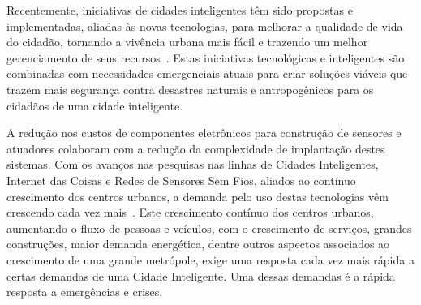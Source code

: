 \begin{refsection}
Recentemente, iniciativas de cidades inteligentes têm sido propostas e implementadas, aliadas às novas tecnologias, para melhorar a qualidade de vida do cidadão, tornando a vivência urbana mais fácil e trazendo um melhor gerenciamento de seus recursos~\cite{Alkhatib2019771}. Estas iniciativas tecnológicas e inteligentes são combinadas com necessidades emergenciais atuais para criar soluções viáveis que trazem mais segurança contra desastres naturais e antropogênicos para os cidadãos de uma cidade inteligente.


A redução nos custos de componentes eletrônicos para construção de sensores e atuadores colaboram com a redução da complexidade de implantação destes sistemas. Com os avanços nas pesquisas nas linhas de Cidades Inteligentes, Internet das Coisas e Redes de Sensores Sem Fios, aliados ao contínuo crescimento dos centros urbanos, a demanda pelo uso destas tecnologias vêm crescendo cada vez mais~\cite{8472005}. Este crescimento contínuo dos centros urbanos, aumentando o fluxo de pessoas e veículos, com o crescimento de serviços, grandes construções, maior demanda energética, dentre outros aspectos associados ao crescimento de uma grande metrópole, exige uma resposta cada vez mais rápida a certas demandas de uma Cidade Inteligente. Uma dessas demandas é a rápida resposta a emergências e crises.


\end{refsection}
